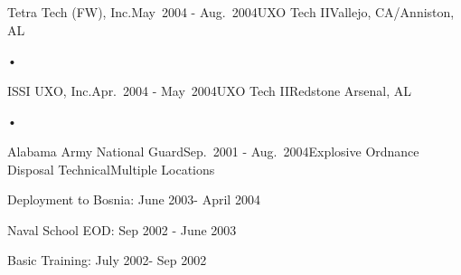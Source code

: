 
\begin{rSubsection}{Tetra Tech (FW), Inc.}{May\ 2004 - Aug.\ 2004}{UXO Tech II}{Vallejo, CA/Anniston, AL}
\item[•]
\end{rSubsection}


\begin{rSubsection}{ISSI UXO, Inc.}{Apr.\ 2004 - May\ 2004}{UXO Tech II}{Redstone Arsenal, AL}
\item[•]
\end{rSubsection}


\begin{rSubsection}{Alabama Army National Guard}{Sep.\ 2001 - Aug.\ 2004}{Explosive Ordnance Disposal Technical}{Multiple Locations}
\item Deployment to Bosnia: June 2003- April 2004
\item Naval School EOD: Sep 2002 - June 2003
\item Basic Training: July 2002- Sep 2002 
\end{rSubsection}
